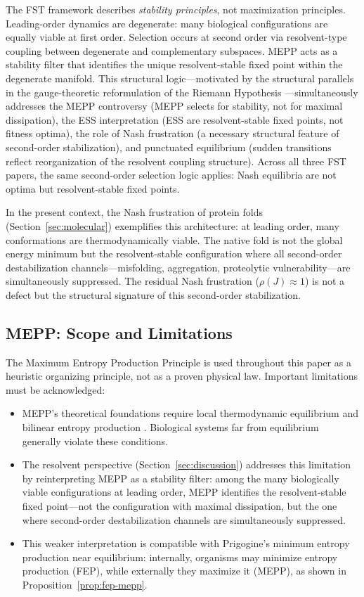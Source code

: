 \documentclass[12pt,a4paper]{article}
\theoremstyle{remark}
\begin{document}
The FST framework describes \emph{stability principles}, not maximization principles. Leading-order dynamics are degenerate: many biological configurations are equally viable at first order. Selection occurs at second order via resolvent-type coupling between degenerate and complementary subspaces. MEPP acts as a stability filter that identifies the unique resolvent-stable fixed point within the degenerate manifold. This structural logic---motivated by the structural parallels in the gauge-theoretic reformulation of the Riemann Hypothesis \citep{FST-RH2}---simultaneously addresses the MEPP controversy (MEPP selects for stability, not for maximal dissipation), the ESS interpretation (ESS are resolvent-stable fixed points, not fitness optima), the role of Nash frustration (a necessary structural feature of second-order stabilization), and punctuated equilibrium (sudden transitions reflect reorganization of the resolvent coupling structure). Across all three FST papers, the same second-order selection logic applies: Nash equilibria are not optima but resolvent-stable fixed points.

In the present context, the Nash frustration of protein folds (Section~\ref{sec:molecular}) exemplifies this architecture: at leading order, many conformations are thermodynamically viable. The native fold is not the global energy minimum but the resolvent-stable configuration where all second-order destabilization channels---misfolding, aggregation, proteolytic vulnerability---are simultaneously suppressed. The residual Nash frustration ($\rho(J) \approx 1$) is not a defect but the structural signature of this second-order stabilization.

\subsection{MEPP: Scope and Limitations}

The Maximum Entropy Production Principle is used throughout this paper as a heuristic organizing principle, not as a proven physical law. Important limitations must be acknowledged:
\begin{itemize}
\item MEPP's theoretical foundations require local thermodynamic equilibrium and bilinear entropy production \citep{Martyushev2010}. Biological systems far from equilibrium generally violate these conditions.
\item The resolvent perspective (Section~\ref{sec:discussion}) addresses this limitation by reinterpreting MEPP as a stability filter: among the many biologically viable configurations at leading order, MEPP identifies the resolvent-stable fixed point---not the configuration with maximal dissipation, but the one where second-order destabilization channels are simultaneously suppressed.
\item This weaker interpretation is compatible with Prigogine's minimum entropy production near equilibrium: internally, organisms may minimize entropy production (FEP), while externally they maximize it (MEPP), as shown in Proposition~\ref{prop:fep-mepp}.
\end{itemize}
\end{document}
